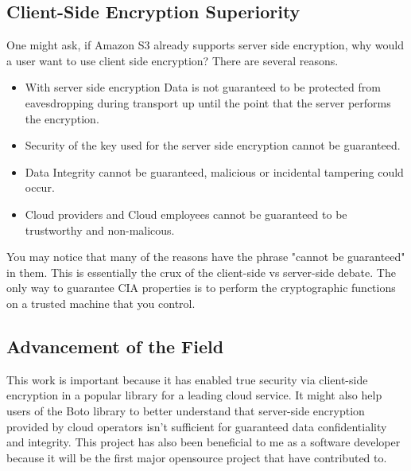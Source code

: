\subsection{Client-Side Encryption Superiority}
One might ask, if Amazon S3 already supports server side encryption, why would a user want to use client side encryption? There are several reasons.
\begin{itemize}
    \item With server side encryption Data is not guaranteed to be protected from eavesdropping during transport up until the point that the server performs the encryption.
    \item Security of the key used for the server side encryption cannot be guaranteed.
    \item Data Integrity cannot be guaranteed, malicious or incidental tampering could occur.
    \item Cloud providers and Cloud employees cannot be guaranteed to be trustworthy and non-malicous.
\end{itemize}

You may notice that many of the reasons have the phrase "cannot be guaranteed" in them. This is essentially the crux 
of the client-side vs server-side debate. The only way to guarantee CIA properties is to perform the cryptographic functions on a
trusted machine that you control.

\subsection{Advancement of the Field}
This work is important because it has enabled true security via client-side encryption in a popular library for a leading cloud service.
It might also help users of the Boto library to better understand that server-side encryption provided by cloud operators isn't sufficient for guaranteed data confidentiality and integrity.
This project has also been beneficial to me as a software developer because it will be the first major opensource project that have contributed to.

